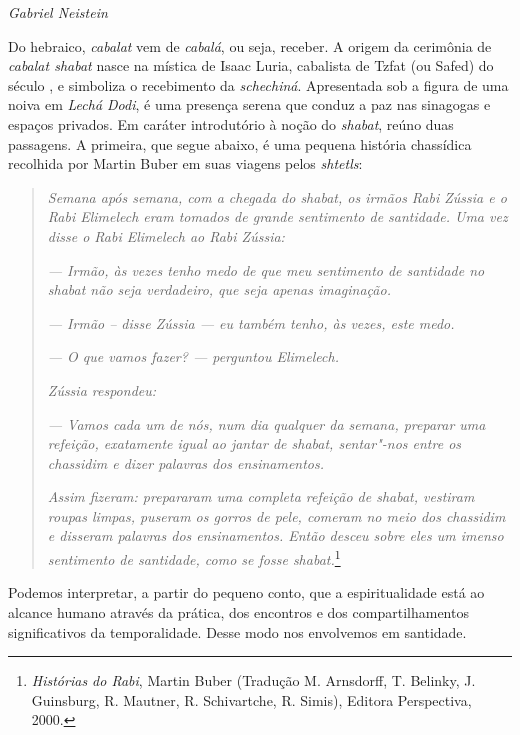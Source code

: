 \begin{flushright}
\emph{Gabriel Neistein}
\end{flushright}


Do hebraico, \emph{cabalat} vem de \emph{cabalá}, ou seja, receber. A
origem da cerimônia de \emph{cabalat shabat} nasce na mística de Isaac Luria,
cabalista de Tzfat (ou Safed) do século , e simboliza o recebimento
da \emph{schechiná}. Apresentada sob a figura de uma noiva em \emph{Lechá Dodi}, é uma
presença serena que conduz a paz nas sinagogas e espaços privados.
Em caráter introdutório à noção do \emph{shabat}, reúno duas passagens. A
primeira, que segue abaixo, é uma pequena história chassídica recolhida
por Martin Buber em suas viagens pelos \emph{shtetls}:

\begin{quote}
\emph{Semana após semana, com a chegada do shabat, os irmãos Rabi Zússia
e o Rabi Elimelech eram tomados de grande sentimento de santidade. Uma
vez disse o Rabi Elimelech ao Rabi Zússia:}

\emph{--- Irmão, às vezes tenho medo de que meu sentimento de santidade
no shabat não seja verdadeiro, que seja apenas imaginação.}

\emph{--- Irmão -- disse Zússia --- eu também tenho, às vezes, este medo.}

\emph{--- O que vamos fazer? --- perguntou Elimelech.}

\emph{Zússia respondeu:}

\emph{--- Vamos cada um de nós, num dia qualquer da semana, preparar uma
refeição, exatamente igual ao jantar de shabat, sentar"-nos entre os
chassidim e dizer palavras dos ensinamentos.}

\emph{Assim fizeram: prepararam uma completa refeição de shabat,
vestiram roupas limpas, puseram os gorros de pele, comeram no meio dos
chassidim e disseram palavras dos ensinamentos. Então desceu sobre eles
um imenso sentimento de santidade, como se fosse shabat.}\footnote{\emph{Histórias do Rabi}, Martin Buber (Tradução M. Arnsdorff, T. Belinky, J. Guinsburg, R. Mautner, R. Schivartche, R. Simis), Editora Perspectiva, 2000.}
\end{quote}

Podemos interpretar, a partir do pequeno conto, que a espiritualidade
está ao alcance humano através da prática, dos encontros e dos
compartilhamentos significativos da temporalidade. Desse modo nos
envolvemos em santidade.

